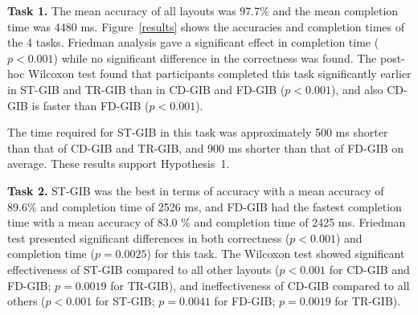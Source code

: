\documentclass[review]{vgtc}                 %
\begin{document}

{\bf Task 1.} The mean accuracy of all layouts was 97.7\% and the mean completion time was 4480 ms.
Figure~\ref{results} shows the accuracies and completion times of the 4 tasks. Friedman analysis gave a significant effect in completion time ($p < 0.001$) while no significant difference in the correctness was found.
The post-hoc Wilcoxon test found that participants completed this task significantly earlier in ST-GIB and TR-GIB than in CD-GIB and FD-GIB ($p<0.001$), and also CD-GIB is faster than FD-GIB ($p<0.001$).

The time required for ST-GIB in this task was approximately 500 ms shorter than that of CD-GIB and TR-GIB, and 900 ms shorter than that of FD-GIB on average.
These results support Hypothesis~1.

{\bf Task 2.} ST-GIB was the best in terms of accuracy with a mean accuracy of 89.6\% and completion time of 2526 ms, and FD-GIB had the fastest completion time with a mean accuracy of 83.0 \% and completion time of 2425 ms.
Friedman test presented significant differences in both correctness ($p<0.001$) and completion time ($p = 0.0025$) for this task.
The Wilcoxon test showed significant effectiveness of ST-GIB compared to all other layouts ($p<0.001$ for CD-GIB and FD-GIB; $p=0.0019$ for TR-GIB), and ineffectiveness of CD-GIB compared to all others ($p<0.001$ for ST-GIB; $p=0.0041$ for FD-GIB; $p=0.0019$ for TR-GIB).
\end{document}
